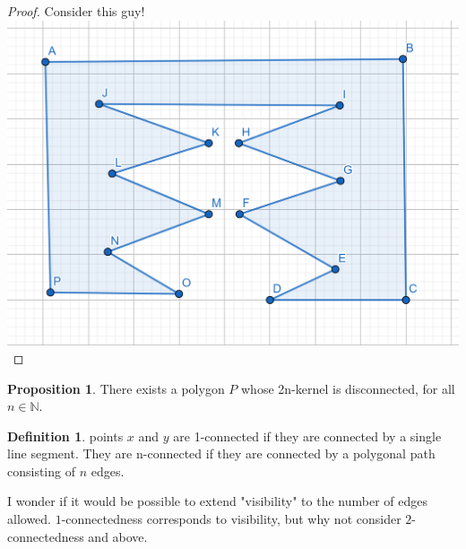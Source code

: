 \documentclass[12pt]{article}
\newcommand{\N}{\mathbb{N}}
\theoremstyle{definition}
\newtheorem*{definition}{Definition}
\newtheorem{proposition}{Proposition}
\begin{document}
\begin{proof}
Consider this guy! \\

\includegraphics[scale=0.5]{4-kernel.png}
\end{proof}

\begin{proposition}
There exists a polygon $P$ whose 2n-kernel is disconnected, for all $n\in \N$.
\end{proposition}


\begin{definition}
points $x$ and $y$ are 1-connected if they are connected by a single line segment. They are n-connected if they are connected by a polygonal path consisting of $n$ edges. 
\end{definition}

I wonder if it would be possible to extend "visibility" to the number of edges allowed. $1$-connectedness corresponds to visibility, but why not consider $2$-connectedness and above. 
\end{document}
